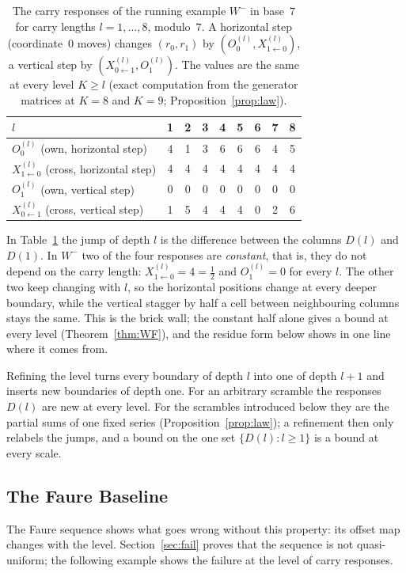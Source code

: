\begin{table}[t]
\centering
\small
\caption{The carry responses of the running example $W^-$ in base~$7$ for carry lengths $l=1,\dots,8$, modulo~$7$. A horizontal step (coordinate~$0$ moves) changes $(r_0,r_1)$ by $(O_0^{(l)},X_{1\leftarrow0}^{(l)})$, a vertical step by $(X_{0\leftarrow1}^{(l)},O_1^{(l)})$. The values are the same at every level $K\ge l$ (exact computation from the generator matrices at $K=8$ and $K=9$; Proposition~\ref{prop:law}).}
\label{tab:running}
\begin{tabular}{@{}l*{8}{c}@{}}
\toprule
$l$ & 1 & 2 & 3 & 4 & 5 & 6 & 7 & 8\\
\midrule
$O_0^{(l)}$ (own, horizontal step) & 4 & 1 & 3 & 6 & 6 & 6 & 4 & 5\\
$X_{1\leftarrow0}^{(l)}$ (cross, horizontal step) & 4 & 4 & 4 & 4 & 4 & 4 & 4 & 4\\
$O_1^{(l)}$ (own, vertical step) & 0 & 0 & 0 & 0 & 0 & 0 & 0 & 0\\
$X_{0\leftarrow1}^{(l)}$ (cross, vertical step) & 1 & 5 & 4 & 4 & 4 & 0 & 2 & 6\\
\bottomrule
\end{tabular}
\end{table}

In Table~\ref{tab:running} the jump of depth $l$ is the difference between the columns $D(l)$ and $D(1)$. In $W^-$ two of the four responses are \emph{constant}, that is, they do not depend on the carry length: $X_{1\leftarrow0}^{(l)}=4=\frac12$ and $O_1^{(l)}=0$ for every $l$. The other two keep changing with $l$, so the horizontal positions change at every deeper boundary, while the vertical stagger by half a cell between neighbouring columns stays the same. This is the brick wall; the constant half alone gives a bound at every level (Theorem~\ref{thm:WF}), and the residue form below shows in one line where it comes from.

Refining the level turns every boundary of depth $l$ into one of depth $l+1$ and inserts new boundaries of depth one. For an arbitrary scramble the responses $D(l)$ are new at every level. For the scrambles introduced below they are the partial sums of one fixed series (Proposition~\ref{prop:law}); a refinement then only relabels the jumps, and a bound on the one set $\{D(l):l\ge1\}$ is a bound at every scale.

\subsection{The Faure Baseline}\label{sec:baseline}
The Faure sequence shows what goes wrong without this property: its offset map changes with the level. Section~\ref{sec:fail} proves that the sequence is not quasi-uniform; the following example shows the failure at the level of carry responses.

